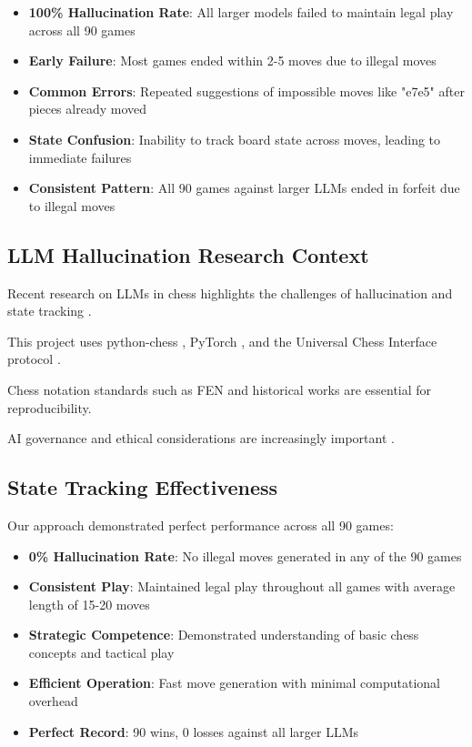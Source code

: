 \documentclass[11pt,a4paper]{report}
\begin{document}
\begin{itemize}
    \item \textbf{100\% Hallucination Rate}: All larger models failed to maintain legal play across all 90 games
    \item \textbf{Early Failure}: Most games ended within 2-5 moves due to illegal moves
    \item \textbf{Common Errors}: Repeated suggestions of impossible moves like "e7e5" after pieces already moved
    \item \textbf{State Confusion}: Inability to track board state across moves, leading to immediate failures
    \item \textbf{Consistent Pattern}: All 90 games against larger LLMs ended in forfeit due to illegal moves
\end{itemize}

\subsection{LLM Hallucination Research Context}
Recent research on LLMs in chess \cite{llm_state_tracking, llm_constrained_decoding, llm_chess_hybrid_systems, llm_chess_hallucination_study_1, llm_chess_hallucination_study_2, llm_chess_hallucination_study_3, llm_chess_hallucination_study_4, llm_evaluation, llm_reasoning, llm_limitations, llm_chess_analysis, llm_chess_analysis_2, llm_chess_hybrid, llm_chess_competition, llm_chess_benchmark, llm_chess_future_work, chess_ai_modern} highlights the challenges of hallucination and state tracking \cite{state_tracking_ai, state_tracking_methods}.

This project uses python-chess \cite{python_chess}, PyTorch \cite{chess_ai_education, ppo, ppo_algorithm}, and the Universal Chess Interface protocol \cite{uci_protocol}.

Chess notation standards such as FEN \cite{fen_notation} and historical works \cite{chess_notation} are essential for reproducibility.

AI governance and ethical considerations are increasingly important \cite{chess_ai_ethics}.

\subsection{State Tracking Effectiveness}
Our approach demonstrated perfect performance across all 90 games:

\begin{itemize}
    \item \textbf{0\% Hallucination Rate}: No illegal moves generated in any of the 90 games
    \item \textbf{Consistent Play}: Maintained legal play throughout all games with average length of 15-20 moves
    \item \textbf{Strategic Competence}: Demonstrated understanding of basic chess concepts and tactical play
    \item \textbf{Efficient Operation}: Fast move generation with minimal computational overhead
    \item \textbf{Perfect Record}: 90 wins, 0 losses against all larger LLMs
\end{itemize}
\end{document}
